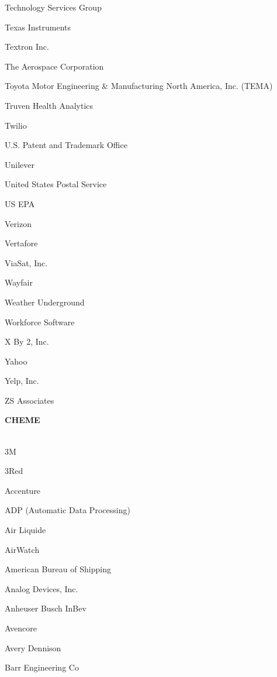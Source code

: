 \documentclass[twoside]{article}
\begin{document}
\begin{center}
\begin{multicols}{5}
\begin{FlushLeft}
\begin{compactitem}
\item Technology Services Group
\item Texas Instruments
\item Textron Inc.
\item The Aerospace Corporation
\item Toyota Motor Engineering \& Manufacturing North America, Inc. (TEMA)
\item Truven Health Analytics
\item Twilio
\item U.S. Patent and Trademark Office
\item Unilever
\item United States Postal Service
\item US EPA
\item Verizon
\item Vertafore
\item ViaSat, Inc.
\item Wayfair
\item Weather Underground
\item Workforce Software
\item X By 2, Inc.
\item Yahoo
\item Yelp, Inc.
\item ZS Associates
\end{compactitem}
        \end{FlushLeft}
        \vspace{1em}
        {\fontsize{14}{16}\selectfont \bf CHEME}\\
        \vspace{-1em}
        ~\hrulefill~
        \vspace{-.9em}
        \begin{FlushLeft}
        \begin{compactitem}
        \item 3M
\item 3Red
\item Accenture
\item ADP (Automatic Data Processing)
\item Air Liquide
\item AirWatch
\item American Bureau of Shipping
\item Analog Devices, Inc.
\item Anheuser Busch InBev
\item Avencore
\item Avery Dennison
\item Barr Engineering Co

\end{compactitem}
\end{FlushLeft}
\end{multicols}
\end{center}
\end{document}
